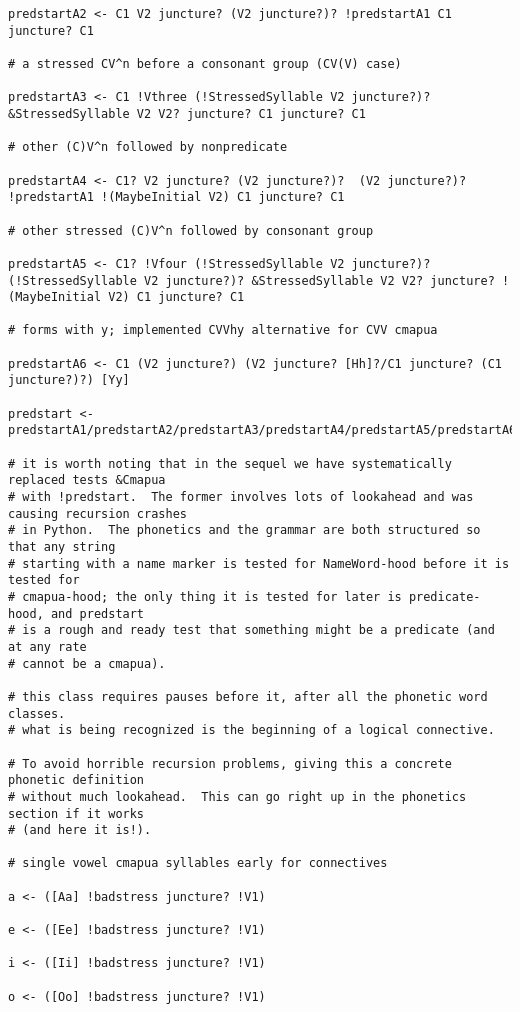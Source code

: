 \documentclass{article}
\begin{document}
\begin{verbatim}
predstartA2 <- C1 V2 juncture? (V2 juncture?)? !predstartA1 C1 juncture? C1

# a stressed CV^n before a consonant group (CV(V) case)

predstartA3 <- C1 !Vthree (!StressedSyllable V2 juncture?)? &StressedSyllable V2 V2? juncture? C1 juncture? C1

# other (C)V^n followed by nonpredicate 

predstartA4 <- C1? V2 juncture? (V2 juncture?)?  (V2 juncture?)? !predstartA1 !(MaybeInitial V2) C1 juncture? C1

# other stressed (C)V^n followed by consonant group

predstartA5 <- C1? !Vfour (!StressedSyllable V2 juncture?)? (!StressedSyllable V2 juncture?)? &StressedSyllable V2 V2? juncture? !(MaybeInitial V2) C1 juncture? C1

# forms with y; implemented CVVhy alternative for CVV cmapua

predstartA6 <- C1 (V2 juncture?) (V2 juncture? [Hh]?/C1 juncture? (C1 juncture?)?) [Yy]

predstart <- predstartA1/predstartA2/predstartA3/predstartA4/predstartA5/predstartA6

# it is worth noting that in the sequel we have systematically replaced tests &Cmapua
# with !predstart.  The former involves lots of lookahead and was causing recursion crashes
# in Python.  The phonetics and the grammar are both structured so that any string
# starting with a name marker is tested for NameWord-hood before it is tested for 
# cmapua-hood; the only thing it is tested for later is predicate-hood, and predstart
# is a rough and ready test that something might be a predicate (and at any rate
# cannot be a cmapua).

# this class requires pauses before it, after all the phonetic word classes.
# what is being recognized is the beginning of a logical connective.

# To avoid horrible recursion problems, giving this a concrete phonetic definition
# without much lookahead.  This can go right up in the phonetics section if it works
# (and here it is!).

# single vowel cmapua syllables early for connectives

a <- ([Aa] !badstress juncture? !V1)

e <- ([Ee] !badstress juncture? !V1)

i <- ([Ii] !badstress juncture? !V1)

o <- ([Oo] !badstress juncture? !V1)


\end{verbatim}
\end{document}
